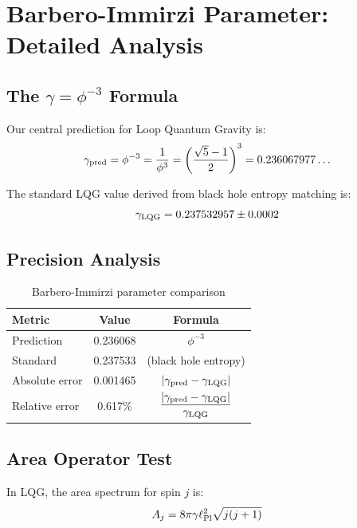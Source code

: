 \section{Barbero-Immirzi Parameter: Detailed Analysis}

\subsection{The $\gamma = \phi^{-3}$ Formula}

Our central prediction for Loop Quantum Gravity is:
\begin{equation}
\gamma_{\rm pred} = \phi^{-3} = \frac{1}{\phi^3} = \left(\frac{\sqrt{5}-1}{2}\right)^3 = 0.236067977\ldots
\end{equation}

The standard LQG value derived from black hole entropy matching is:
\begin{equation}
\gamma_{\rm LQG} = 0.237532957 \pm 0.0002
\end{equation}

\subsection{Precision Analysis}

\begin{table}[h]
\centering
\begin{tabular}{lcc}
\hline
\textbf{Metric} & \textbf{Value} & \textbf{Formula} \\
\hline
Prediction & 0.236068 & $\phi^{-3}$ \\
Standard & 0.237533 & (black hole entropy) \\
Absolute error & 0.001465 & $|\gamma_{\rm pred} - \gamma_{\rm LQG}|$ \\
Relative error & 0.617\% & $\dfrac{|\gamma_{\rm pred} - \gamma_{\rm LQG}|}{\gamma_{\rm LQG}}$ \\
\hline
\end{tabular}
\caption{Barbero-Immirzi parameter comparison}
\end{table}

\subsection{Area Operator Test}

In LQG, the area spectrum for spin $j$ is:
\begin{equation}
A_j = 8\pi\gamma\ell_{\rm Pl}^2\sqrt{j(j+1)}
\end{equation}

